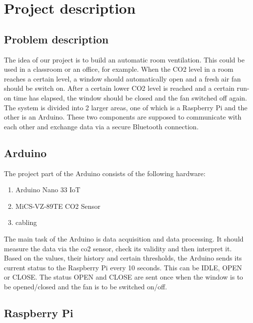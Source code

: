 \section{Project description}
\label{chapter1}

\subsection{Problem description}

The idea of our project is to build an automatic room ventilation. This could be used in a classroom or an office, for example. When the CO2 level in a room reaches a certain level, a window should automatically open and a fresh air fan should be switch on. After a certain lower CO2 level is reached and a certain run-on time has elapsed, the window should be closed and the fan switched off again.\\

The system is divided into 2 larger areas, one of which is a Raspberry Pi and the other is an Arduino. These two components are supposed to communicate with each other and exchange data via a secure Bluetooth connection. 

\subsection{Arduino}

The project part of the Arduino consists of the following hardware:

\begin{enumerate}[label*=\arabic*.]
    \item \label{hw.1} Arduino Nano 33 IoT 
    \item \label{hw.2} MiCS-VZ-89TE CO2 Sensor
    \item \label{hw.3} cabling
\end{enumerate}

The main task of the Arduino is data acquisition and data processing. It should measure the data via the co2 sensor, check its validity and then interpret it. Based on the values, their history and certain thresholds, the Arduino sends its current status to the Raspberry Pi every 10 seconds. This can be IDLE, OPEN or CLOSE. The status OPEN and CLOSE are sent once when the window is to be opened/closed and the fan is to be switched on/off.

\subsection{Raspberry Pi}

